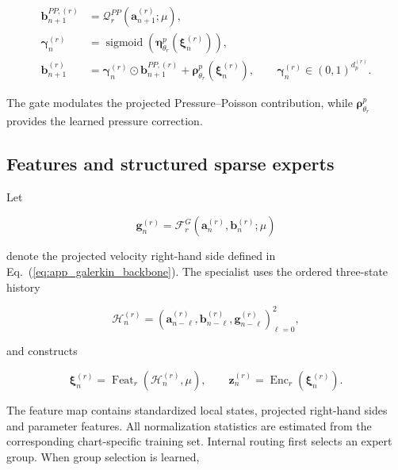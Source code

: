 \documentclass{article}
\def\plaineqref#1{\ref{#1}}
\begin{document}
\begin{align}
  \bm b_{n+1}^{PP,(r)}
  &=
  \mathcal Q_r^{PP}
  \left(
    \bm a_{n+1}^{(r)};\mu
  \right),
  \nonumber\\
  \bm\gamma_n^{(r)}
  &=
  \operatorname{sigmoid}
  \left(
    \bm\eta^p_{\theta_r}
    (\bm\xi_n^{(r)})
  \right),
  \nonumber\\
  \bm b_{n+1}^{(r)}
  &=
  \bm\gamma_n^{(r)}
  \odot
  \bm b_{n+1}^{PP,(r)}
  +
  \bm\rho^p_{\theta_r}
  (\bm\xi_n^{(r)}),
  \qquad
  \bm\gamma_n^{(r)}
  \in(0,1)^{d_p^{(r)}}.
  \label{eq:app_pressure_closure}
\end{align}


The gate modulates the projected Pressure--Poisson contribution, while
$\bm\rho^p_{\theta_r}$ provides the learned pressure correction.


\subsection{Features and structured sparse experts}

Let


\begin{equation}
  \bm g_n^{(r)}
  =
  \mathcal F_r^G
  \left(
    \bm a_n^{(r)},\bm b_n^{(r)};\mu
  \right)
  \label{eq:app_galerkin_feature}
\end{equation}


denote the projected velocity right-hand side defined in Eq.~(\plaineqref{eq:app_galerkin_backbone}). The specialist uses the ordered three-state history


\begin{equation}
  \mathcal H_n^{(r)}
  =
  \left(
    \bm a_{n-\ell}^{(r)},
    \bm b_{n-\ell}^{(r)},
    \bm g_{n-\ell}^{(r)}
  \right)_{\ell=0}^{2},
  \label{eq:app_specialist_history}
\end{equation}


and constructs


\begin{equation}
  \bm\xi_n^{(r)}
  =
  \operatorname{Feat}_r
  \left(
    \mathcal H_n^{(r)},\mu
  \right),
  \qquad
  \bm z_n^{(r)}
  =
  \operatorname{Enc}_r
  \left(
    \bm\xi_n^{(r)}
  \right).
  \label{eq:app_specialist_features}
\end{equation}


The feature map contains standardized local states, projected
right-hand sides and parameter features. All normalization statistics are estimated from the corresponding chart-specific training set. Internal routing first selects an expert group. When group selection is learned,
\end{document}
